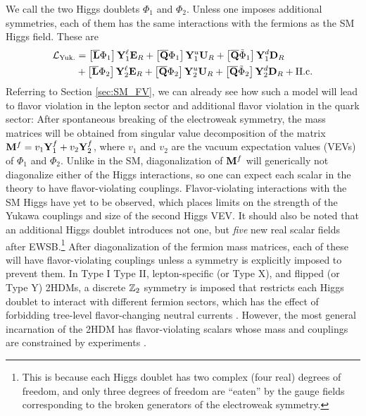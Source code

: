 We call the two Higgs doublets $\Phi_1$ and $\Phi_2$. Unless one imposes additional symmetries, each of them has the same interactions with the fermions as the SM Higgs field. These are
 \begin{align}
    {\cal L}_{\rm Yuk.} &= \left[\overline{\bf L}\Phi_1\right]{\bf Y}_1^\ell {\bf E}_R + \left[\overline{\bf Q}\Phi_1\right]{\bf Y}_1^u {\bf U}_R + \left[\overline{\bf Q}\tilde{\Phi}_1\right]{\bf Y}_1^d {\bf D}_R \nonumber \\
    &+ \left[\overline{\bf L}\Phi_2\right]{\bf Y}_2^\ell {\bf E}_R + \left[\overline{\bf Q}\Phi_2\right]{\bf Y}_2^u {\bf U}_R + \left[\overline{\bf Q}\tilde{\Phi}_2\right]{\bf Y}_2^d {\bf D}_R + {\rm H.c.}
 \end{align} 
Referring to Section \ref{sec:SM_FV}, we can already see how such a model will lead to flavor violation in the lepton sector and additional flavor violation in the quark sector: After spontaneous breaking of the electroweak symmetry,  the mass matrices will be obtained from singular value decomposition of the matrix ${\bf M}^f = v_1{\bf Y}_1^f + v_2{\bf Y}_2^f$, where $v_1$ and $v_2$ are the vacuum expectation values (VEVs) of $\Phi_1$ and $\Phi_2$. Unlike in the SM, diagonalization of ${\bf M}^f$ will generically not diagonalize either of the Higgs interactions, so one can expect each scalar in the theory to have flavor-violating couplings. Flavor-violating interactions with the SM Higgs have yet to be observed, which places limits on the strength of the Yukawa couplings and size of the second Higgs VEV. It should also be noted that an additional Higgs doublet introduces not one, but {\it five} new real scalar fields after EWSB.\footnote{This is because each Higgs doublet has two complex (four real) degrees of freedom, and only three degrees of freedom are ``eaten'' by the gauge fields corresponding to the broken generators of the electroweak symmetry.} After diagonalization of the fermion mass matrices, each of these will have flavor-violating couplings unless a symmetry is explicitly imposed to prevent them. In Type I Type II, lepton-specific (or Type X), and flipped (or Type Y) 2HDMs, a discrete ${\Bbb Z}_2$ symmetry is imposed that restricts each Higgs doublet to interact with different fermion sectors, which has the effect of forbidding tree-level flavor-changing neutral currents \cite{Glashow:1976nt,Paschos:1976ay,Aoki:2009ha,Branco:2011iw,Wang:2022yhm}. However, the most general incarnation of the 2HDM has flavor-violating scalars whose mass and couplings are constrained by experiments \cite{Harnik:2012pb,Primulando:2019ydt}.


